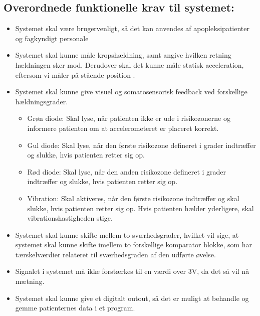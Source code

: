 \subsection{Overordnede funktionelle krav til systemet:}\label{FunkKrav}
\begin{itemize}
	\item Systemet skal være brugervenligt, så det kan anvendes af apopleksipatienter og fagkyndigt personale
	\item Systemet skal kunne måle kropshældning, samt angive hvilken retning hældningen sker mod. Derudover skal det kunne måle statisk acceleration, eftersom vi måler på stående position .
	\item Systemet skal kunne give visuel og somatosensorisk feedback ved forskellige hældningsgrader.
	\begin{itemize}
		\item Grøn diode: Skal lyse, når patienten ikke er ude i risikozonerne og informere patienten om at accelerometeret er placeret korrekt.  
		\item Gul diode: Skal lyse, når den første risikozone defineret i grader indtræffer og slukke, hvis patienten retter sig op.
		\item Rød diode: Skal lyse, når den anden risikozone defineret i grader indtræffer og slukke, hvis patienten retter sig op.
		\item Vibration: Skal aktiveres, når den første risikozone indtræffer og skal slukke, hvis patienten retter sig op. Hvis patienten hælder yderligere, skal vibrationshastigheden stige.
	\end{itemize}
	\item Systemet skal kunne skifte mellem to sværhedsgrader, hvilket vil sige, at systemet skal kunne skifte imellem to forskellige komparator blokke, som har tærskelværdier relateret til sværhedsgraden af den udførte øvelse.
	\item Signalet i systemet må ikke forstærkes til en værdi over 3V, da det så vil nå mætning.
	\item Systemet skal kunne give et digitalt outout, så det er muligt at behandle og gemme patienternes data i et program.
\end{itemize}

